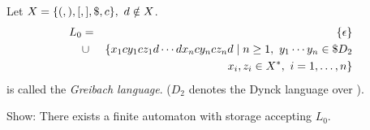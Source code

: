 \bigskip
\begin{exercise}
Let $X = \mbox{$\{(, ), [, ], \$, c\}$},\ d \notin X$.
\begin{eqnarray*}
L_0 &=& \mbox{$\{\epsilon\}$} \\
&\cup& \{x_1 c y_1 c z_1 d \cdots d x_n c y_n c
z_n d \mid n \geq 1,\ y_1 \cdots y_n \in \$ D_2 \\
& & x_i, z_i \in X^*,\ i=1, \ldots, n \} 
\end{eqnarray*}
is called the {\em Greibach language}. ($D_2$ denotes the Dynck language over
\setof{(, ), [, ]}).

Show: There exists a finite automaton with storage accepting $L_0$.
\end{exercise}















































